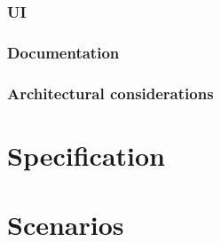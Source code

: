 \documentclass{article}
\begin{document}
\subsubsection{UI}
\subsubsection{Documentation}
\subsubsection{Architectural considerations}
\section{Specification}
\section{Scenarios}
\end{document}
